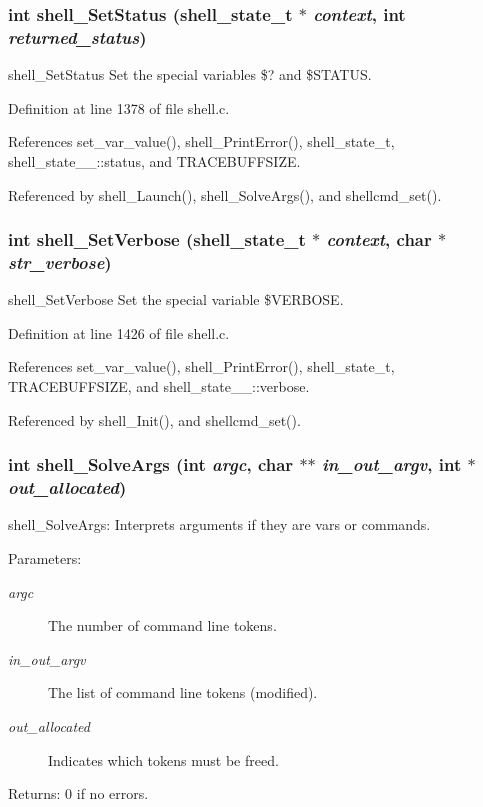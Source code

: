 \subsubsection{\setlength{\rightskip}{0pt plus 5cm}int shell\_\-Set\-Status ({\bf shell\_\-state\_\-t} $\ast$ {\em context}, int {\em returned\_\-status})}\label{shell_8c_a31}


shell\_\-Set\-Status Set the special variables \$? and \$STATUS. 

Definition at line 1378 of file shell.c.

References set\_\-var\_\-value(), shell\_\-Print\-Error(), shell\_\-state\_\-t, shell\_\-state\_\-\_\-::status, and TRACEBUFFSIZE.

Referenced by shell\_\-Launch(), shell\_\-Solve\-Args(), and shellcmd\_\-set().
\subsubsection{\setlength{\rightskip}{0pt plus 5cm}int shell\_\-Set\-Verbose ({\bf shell\_\-state\_\-t} $\ast$ {\em context}, char $\ast$ {\em str\_\-verbose})}\label{shell_8c_a33}


shell\_\-Set\-Verbose Set the special variable \$VERBOSE. 

Definition at line 1426 of file shell.c.

References set\_\-var\_\-value(), shell\_\-Print\-Error(), shell\_\-state\_\-t, TRACEBUFFSIZE, and shell\_\-state\_\-\_\-::verbose.

Referenced by shell\_\-Init(), and shellcmd\_\-set().
\subsubsection{\setlength{\rightskip}{0pt plus 5cm}int shell\_\-Solve\-Args (int {\em argc}, char $\ast$$\ast$ {\em in\_\-out\_\-argv}, int $\ast$ {\em out\_\-allocated})}\label{shell_8c_a24}


shell\_\-Solve\-Args: Interprets arguments if they are vars or commands.

\begin{Desc}
\item[Parameters:]
\begin{description}
\item[{\em argc}]The number of command line tokens. \item[{\em in\_\-out\_\-argv}]The list of command line tokens (modified). \item[{\em out\_\-allocated}]Indicates which tokens must be freed.\end{description}
\end{Desc}
\begin{Desc}
\item[Returns:]0 if no errors. \end{Desc}


